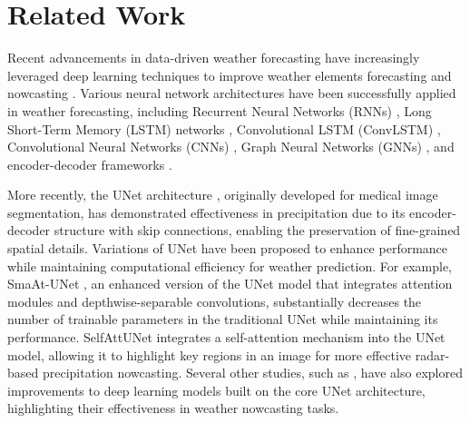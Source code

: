 \section{Related Work}
Recent advancements in data-driven weather forecasting have increasingly leveraged deep learning techniques to improve weather elements forecasting and nowcasting \cite{10220887, 9308323, aykas2021multistream, chen2020deep, bilgin2021tent}. Various neural network architectures have been successfully applied in weather forecasting, including Recurrent Neural Networks (RNNs) \cite{singh2019weather}, Long Short-Term Memory (LSTM) networks \cite{zaytar2016sequence}, Convolutional LSTM (ConvLSTM) \cite{shi2015convolutional}, Convolutional Neural Networks (CNNs) \cite{ayzel2020rainnet}, Graph Neural Networks (GNNs) \cite{simeunovic2021spatio}, and encoder-decoder frameworks \cite{larraondo2019data}.

More recently, the UNet architecture \cite{ronneberger2015unetconvolutionalnetworksbiomedical}, originally developed for medical image segmentation, has demonstrated effectiveness in precipitation due to its encoder-decoder structure with skip connections, enabling the preservation of fine-grained spatial details. Variations of UNet have been proposed to enhance performance while maintaining computational efficiency for weather prediction. For example, SmaAt-UNet \cite{trebing2021smaat}, an enhanced version of the UNet model that integrates attention modules and depthwise-separable convolutions, substantially decreases the number of trainable parameters in the traditional UNet while maintaining its performance. SelfAttUNet \cite{nie2021self} integrates a self-attention mechanism into the UNet model, allowing it to highlight key regions in an image for more effective radar-based precipitation nowcasting.  
Several other studies, such as \cite{kaparakis2023wf, reulen2024ga, renault2023sar}, have also explored improvements to deep learning models built on the core UNet architecture, highlighting their effectiveness in weather nowcasting tasks. 


